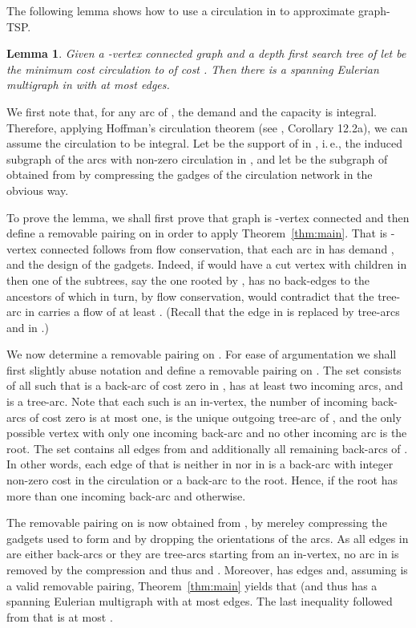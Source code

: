\documentclass[letterpaper,11pt]{article}
\newtheorem{lemma}[theorem]{Lemma}
\newenvironment{proof}{\begin{trivlist}
\item[\hskip\labelsep {\bf Proof}.]}{\QED \end{trivlist}}
\newcommand{\QED}{\hfill }
\newcommand{\MS}{\ensuremath{\mbox{removable pairing}}\xspace}
\newcommand{\oa}[1]{\ensuremath{\overrightarrow{#1}}}
\newcommand{\TSP}{graph-TSP\xspace}
\begin{document}
The following lemma shows how to use a circulation in  to approximate
\TSP.
\begin{lemma}
\label{lemma:costcirc}
Given a -vertex connected graph  and a depth first search tree
 of  let  be the minimum cost circulation to  of
cost . Then there is a spanning Eulerian multigraph  in
 with at most  edges.
\end{lemma}
\begin{proof}
  \newcommand{\flowT}{\ensuremath{\oa{T}}}
  \newcommand{\graphC}{\ensuremath{{C^*(G,T)}}} We first note that,
  for any arc of , the demand and the capacity is integral.
  Therefore, applying Hoffman's circulation theorem (see \cite{Sch03},
  Corollary 12.2a), we can assume the circulation  to be
  integral.  Let  be the support of  in ,
  i.\,e., the induced subgraph of the arcs with non-zero circulation
  in , and let  be the subgraph of  obtained from
   by compressing the gadges of the circulation network in
  the obvious way. 

  To prove the lemma, we shall first prove that graph  is
  -vertex connected and then define a removable pairing  on
   in order to apply Theorem~\ref{thm:main}. That  is
  -vertex connected follows from flow conservation, that each arc
   in  has demand , and the design of the
  gadgets. Indeed, if  would have a cut vertex  with children
   in  then one of the subtrees, say the
  one rooted by , has no back-edges to the ancestors of  which
  in turn, by flow conservation, would contradict that the tree-arc
   in  carries a flow of at least . (Recall that
  the edge  in  is replaced by tree-arcs  and
   in .)

  We now determine a \MS  on . For ease of argumentation we
  shall first slightly abuse notation and define a \MS  on
  .
  The set  consists of all  such that  is a
  back-arc of cost zero in ,  has at least two incoming
  arcs, and  is a tree-arc.  Note that each such  is an
  in-vertex, the number of incoming back-arcs of cost zero is at most
  one,  is the unique outgoing tree-arc of , and the only
  possible vertex  with only one incoming back-arc and no other
  incoming arc is the root.
  The set  contains all edges from  and additionally all
  remaining back-arcs of .  In other words, each edge of
   that is neither in  nor in  is a back-arc with
  integer non-zero cost in the circulation or a back-arc to the
  root. Hence,  if the root has more than one
  incoming back-arc and  otherwise.

  The \MS  on  is now obtained from , by
  mereley compressing the gadgets used to form  and by
  dropping the orientations of the arcs. As all edges in  are
  either back-arcs or they are tree-arcs starting from an in-vertex,
  no arc in  is removed by the compression and thus 
  and . Moreover,  has 
  edges and, assuming  is a valid \MS, Theorem~\ref{thm:main} 
  yields that  (and thus  has a spanning Eulerian multigraph
  with at most  edges. The
  last inequality followed  from that   is at most
  .
 

\end{proof}
\end{document}
